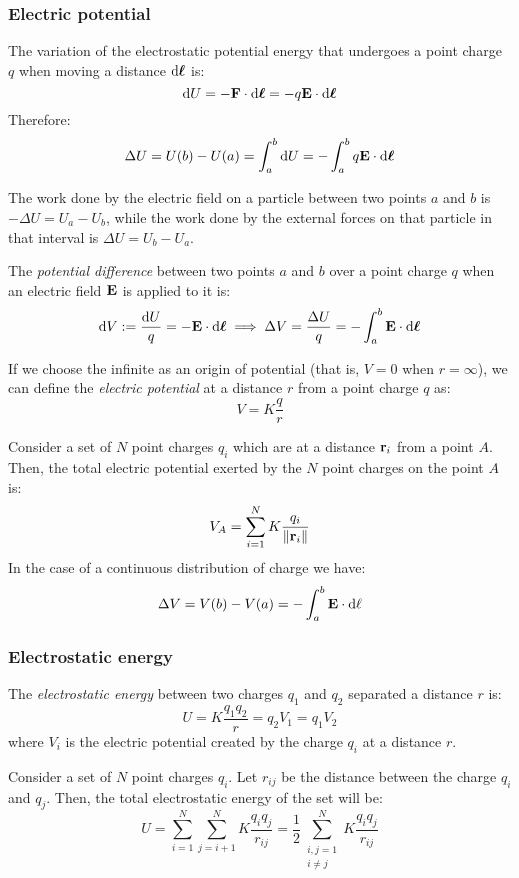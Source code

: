 \documentclass[../../../main.tex]{subfiles}
\begin{document}
\begin{multicols}{2}
  \subsubsection{Electric potential}
  \begin{proposition}
    The variation of the electrostatic potential energy that undergoes a point charge $q$ when moving a distance $\dd{\boldsymbol{\mathrm{\ell}}}$ is:
    $$\dd{U}=-\boldsymbol{\mathrm{F}}\cdot \dd{\boldsymbol{\mathrm{\ell}}}=-q\boldsymbol{\mathrm{E}}\cdot \dd{\boldsymbol{\mathrm{\ell}}}$$
    Therefore:
    $$\Delta U=U(b)-U(a)=\int_a^b\dd{U}=-\int_a^bq\boldsymbol{\mathrm{E}}\cdot \dd{\boldsymbol{\mathrm{\ell}}}$$
  \end{proposition}
  \begin{proposition}
    The work done by the electric field on a particle between two points $a$ and $b$ is $-\Delta U=U_a-U_b$, while the work done by the external forces on that particle in that interval is $\Delta U=U_b-U_a$.
  \end{proposition}
  \begin{definition}
    The \emph{potential difference} between two points $a$ and $b$ over a point charge $q$ when an electric field $\boldsymbol{\mathrm{E}}$ is applied to it is:
    $$\dd{V}:=\frac{\dd{U}}{q}=-\boldsymbol{\mathrm{E}}\cdot\dd{\boldsymbol{\mathrm{\ell}}}\implies\Delta V=\frac{\Delta U}{q}=-\int_a^b\boldsymbol{\mathrm{E}}\cdot\dd{\boldsymbol{\mathrm{\ell}}}$$
  \end{definition}
  \begin{definition}
    If we choose the infinite as an origin of potential (that is, $V=0$ when $r=\infty$), we can define the \emph{electric potential} at a distance $r$ from a point charge $q$ as: $$V=K\frac{q}{r}$$
  \end{definition}
  \begin{principle}
    Consider a set of $N$ point charges $q_i$ which are at a distance $\boldsymbol{\mathrm{r}}_i$ from a point $A$. Then, the total electric potential exerted by the $N$ point charges on the point $A$ is:
    $$V_A=\sum_{i=1}^NK\frac{q_i}{\|\boldsymbol{\mathrm{r}}_{i}\|}$$
    In the case of a continuous distribution of charge we have:
    $$\Delta V=V(b)-V(a)=-\int_a^b\boldsymbol{\mathrm{E}}\cdot\dd\ell$$
  \end{principle}
  \subsubsection{Electrostatic energy}
  \begin{definition}
    The \emph{electrostatic energy} between two charges $q_1$ and $q_2$ separated a distance $r$ is: $$U=K\frac{q_1q_2}{r}=q_2V_1=q_1V_2$$
    where $V_i$ is the electric potential created by the charge $q_i$ at a distance $r$.
  \end{definition}
  \begin{proposition}
    Consider a set of $N$ point charges $q_i$. Let $r_{ij}$ be the distance between the charge $q_i$ and $q_j$. Then, the total electrostatic energy of the set will be: $$U=\sum_{i=1}^N\sum_{j=i+1}^NK\frac{q_iq_j}{r_{ij}}=\frac{1}{2}\sum_{\substack{i,j=1\\i\ne j}}^NK\frac{q_iq_j}{r_{ij}}$$
  \end{proposition}

\end{multicols}
\end{document}
